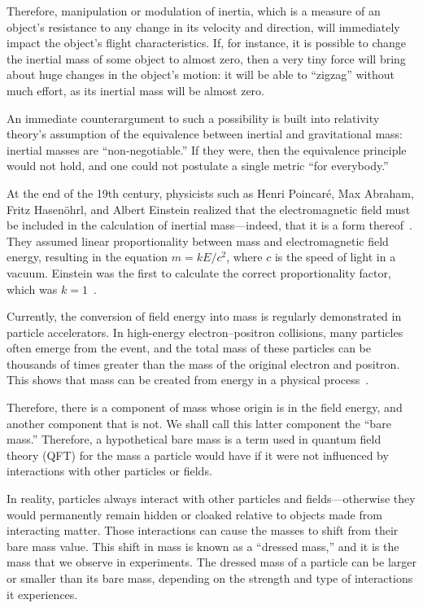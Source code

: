 Therefore, manipulation or modulation of inertia, which is a measure of an object's resistance to any change in its velocity and direction,
will immediately impact the object's flight characteristics.
If, for instance, it is possible to change the inertial mass of some object to almost zero, then a very tiny force will bring about huge
changes in the object's motion: it will be able to ``zigzag'' without much effort, as its inertial mass will be almost zero.

An immediate counterargument to such a possibility is built into relativity theory's assumption of the equivalence between inertial and gravitational mass:
inertial masses are ``non-negotiable.'' If they were, then the equivalence principle would not hold,
and one could not postulate a single metric ``for everybody.''

At the end of the 19th century, physicists such as Henri Poincar\'e, Max Abraham, Fritz Hasen\"ohrl,
and Albert Einstein realized that the electromagnetic field must be included in the calculation of inertial mass---indeed, that it is a form thereof~\cite{Boughn2011Aug}.
They assumed linear proportionality between mass and electromagnetic field energy, resulting in the equation $m = k E / c^2$, where $c$ is the speed of light in a vacuum.
Einstein was the first to calculate the correct proportionality factor, which was $k=1$~\cite{Einstein1905Jan,Einstein2005Apr}.

Currently, the conversion of field energy into mass is regularly demonstrated in particle accelerators.
In high-energy electron--positron collisions, many particles often emerge from the event, and the total mass of these particles can be thousands of times greater than the mass of the original electron and positron.
This shows that mass can be created from energy in a physical process~\cite{Wilczek2003}.

Therefore, there is a component of mass whose origin is in the field energy,
and another component that is not.
We shall call this latter component the ``bare mass.'' Therefore, a hypothetical bare mass is a term used in quantum field theory (QFT)
for the mass a particle would have if it were not influenced by interactions with other particles or fields.


In reality, particles always interact with other particles and fields---otherwise
they would permanently remain hidden or cloaked relative to objects made from interacting matter.
Those interactions can cause the masses to shift from their bare mass value.
This shift in mass is known as a ``dressed mass,''
and it is the mass that we observe in experiments.
The dressed mass of a particle can be larger or smaller than its bare mass,
depending on the strength and type of interactions it experiences.


